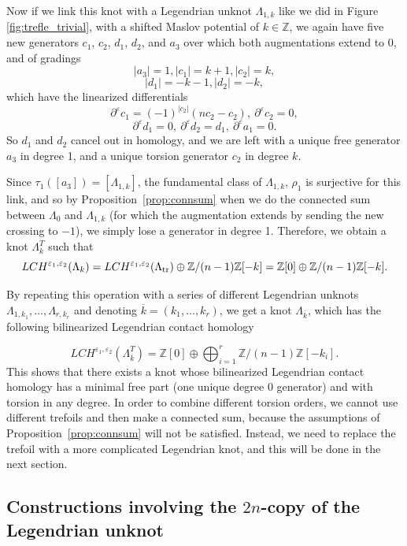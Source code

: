 \documentclass[11pt]{amsart}
\theoremstyle{plain}
\theoremstyle{remark}
\numberwithin{equation}{section}
\newcommand{\Z}{\ensuremath{\mathbb{Z}}}
\begin{document}
Now if we link this knot with a Legendrian unknot $\Lambda_{1,k}$ like we did in Figure \ref{fig:trefle_trivial}, with a shifted Maslov potential of $k\in\Z$, we again have five new generators $c_1$, $c_2$, $d_1$, $d_2$, and $a_3$ over which both augmentations extend to 0, and of gradings
 \[|a_3| = 1, |c_1| = k+1, |c_2| = k,\]
\[|d_1| = -k-1, |d_2| = -k,\]
which have the linearized differentials
\[\partial^{\varepsilon} c_1 = (-1)^{|c_2|}(nc_2 - c_2), \ \partial^{\varepsilon}c_2=0,\]
\[\partial^{\varepsilon}d_1 = 0, \ \partial^{\varepsilon}d_2 = d_1,\  \partial^{\varepsilon}a_1 = 0.\]
So $d_1$ and $d_2$ cancel out in homology, and we are left with a unique free generator $a_3$ in degree 1, and a unique torsion generator $c_2$ in degree $k$. 

Since $\tau_1([a_3])=[\Lambda_{1,k}]$, the fundamental class of $\Lambda_{1,k}$, $\rho_1$ is surjective for this link, and so by Proposition~\ref{prop:connsum} when we do the connected sum between $\Lambda_0$ and $\Lambda_{1,k}$ (for which the augmentation extends by sending the new crossing to $-1$), we simply lose a generator in degree 1. 
Therefore, we obtain a knot $\Lambda^T_k$ such that
$$
LCH^{\varepsilon_1, \varepsilon_2}(\Lambda_k) = LCH^{\varepsilon_1, \varepsilon_2}(\Lambda_{\rm tr}) \oplus \Z/(n-1)\Z[-k]
= \Z[0] \oplus \Z/(n-1)\Z[-k].
$$

By repeating this operation with a series of different Legendrian unknots $\Lambda_{1, k_1}, \ldots, \Lambda_{r,k_r}$ and denoting
$\overline{k} = (k_1, \ldots, k_r)$, we get a knot $\Lambda_{\overline{k}}$, which has the following bilinearized Legendrian 
contact homology 

$$
LCH^{\varepsilon_1,\varepsilon_2}(\Lambda^T_{\overline{k}}) = \Z[0] \oplus \bigoplus_{i=1}^r \Z/(n-1)\Z[-k_i].
$$
This shows that there exists a knot whose bilinearized Legendrian contact homology has a minimal free part (one unique degree 0 generator) 
and with torsion in any degree. In order to combine different torsion orders, we cannot use different trefoils and then make a connected sum, 
because the assumptions of Proposition~\ref{prop:connsum} will not be satisfied. Instead, we need to replace the trefoil with a more complicated 
Legendrian knot, and this will be done in the next section.



\subsection{Constructions involving the $2n$-copy of the Legendrian unknot}\label{subsection:2n-copy}
\end{document}
